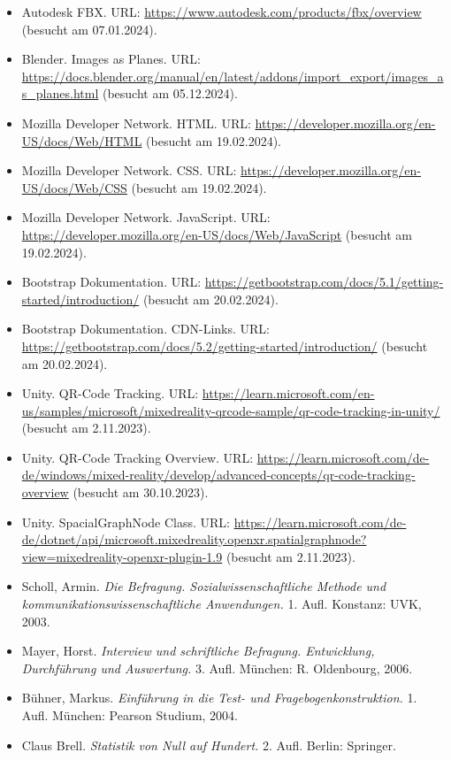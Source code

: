 \begin{itemize}
    \item Autodesk FBX. URL: \url{https://www.autodesk.com/products/fbx/overview} (besucht am 07.01.2024).
    \item Blender. Images as Planes. URL: \url{https://docs.blender.org/manual/en/latest/addons/import_export/images_as_planes.html} (besucht am 05.12.2024).
    \item Mozilla Developer Network. HTML. URL: \url{https://developer.mozilla.org/en-US/docs/Web/HTML} (besucht am 19.02.2024).
    \item Mozilla Developer Network. CSS. URL: \url{https://developer.mozilla.org/en-US/docs/Web/CSS} (besucht am 19.02.2024).
    \item Mozilla Developer Network. JavaScript. URL: \url{https://developer.mozilla.org/en-US/docs/Web/JavaScript} (besucht am 19.02.2024).
    \item Bootstrap Dokumentation. URL: \url{https://getbootstrap.com/docs/5.1/getting-started/introduction/} (besucht am 20.02.2024).
    \item Bootstrap Dokumentation. CDN-Links. URL: \url{https://getbootstrap.com/docs/5.2/getting-started/introduction/} (besucht am 20.02.2024).
    \item Unity. QR-Code Tracking. URL: \url{https://learn.microsoft.com/en-us/samples/microsoft/mixedreality-qrcode-sample/qr-code-tracking-in-unity/} (besucht am 2.11.2023).
    \item Unity. QR-Code Tracking Overview. URL: \url{https://learn.microsoft.com/de-de/windows/mixed-reality/develop/advanced-concepts/qr-code-tracking-overview} (besucht am 30.10.2023).
    \item Unity. SpacialGraphNode Class. URL: \url{https://learn.microsoft.com/de-de/dotnet/api/microsoft.mixedreality.openxr.spatialgraphnode?view=mixedreality-openxr-plugin-1.9} (besucht am 2.11.2023).
    \item Scholl, Armin. \textit{Die Befragung. Sozialwissenschaftliche Methode und kommunikationswissenschaftliche Anwendungen.} 1. Aufl. Konstanz: UVK, 2003.
    \item Mayer, Horst. \textit{Interview und schriftliche Befragung. Entwicklung, Durchführung und Auswertung.} 3. Aufl. München: R. Oldenbourg, 2006.
    \item Bühner, Markus. \textit{Einführung in die Test- und Fragebogenkonstruktion.} 1. Aufl. München: Pearson Studium, 2004.
    \item Claus Brell. \textit{Statistik von Null auf Hundert.} 2. Aufl. Berlin: Springer.

\end{itemize}
